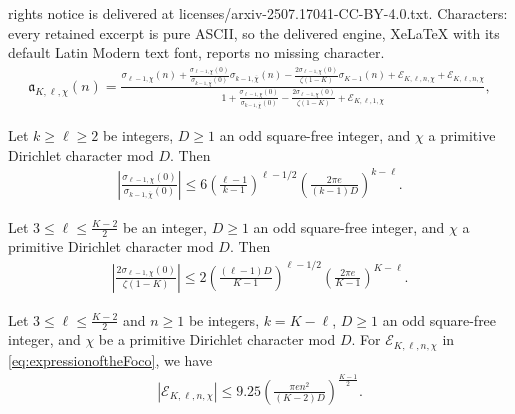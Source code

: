 \documentclass[10pt,a4paper]{amsart}
\begin{document}
rights notice is delivered at licenses/arxiv-2507.17041-CC-BY-4.0.txt. Characters: every retained excerpt is pure ASCII, so the delivered engine, XeLaTeX with its default Latin Modern text font, reports no missing character.
\begin{align}
    \mathfrak{a}_{K,\ell,\chi}(n)=\frac{\sigma_{\ell-1,\chi}(n)+\frac{\sigma_{\ell-1,\chi}(0)}{\sigma_{k-1,\overline{\chi}}(0)}\sigma_{k-1,\overline{\chi}}(n)-\frac{2\sigma_{\ell-1,\chi}(0)}{\zeta(1-K) }\sigma_{K-1}(n)+\mathcal{E}_{K,\ell,n,\chi}+\mathscr{E}_{K,\ell,n,\chi}}{1+\frac{\sigma_{\ell-1,\chi}(0)}{\sigma_{k-1,\overline{\chi}}(0)}-\frac{2\sigma_{\ell-1,\chi}(0)}{\zeta(1-K) }+\mathscr{E}_{K,\ell,1,\chi}}, \label{eq:expressionoftheFoco}
\end{align}

\begin{lemma}\label{lem:bdquotientLvalues}
    Let $k\geq\ell\geq2$ be integers, $D\geq1$ an odd square-free integer, and $\chi$  a primitive Dirichlet character mod $D$. Then
   \begin{align*}
        \left|\frac{\sigma_{\ell-1,\chi}(0)}{\sigma_{k-1,\overline{\chi}}(0)}\right|\leq 6\left(\frac{\ell-1}{k-1}\right)^{\ell-1/2}\left(\frac{2\pi e}{(k-1)D}\right)^{k-\ell}.
         \end{align*}
\end{lemma}

\begin{lemma}\label{lem:bdquotientLandzeta}
    Let $3\leq\ell\leq\frac{K-2}{2}$ be an integer, $D\geq1$ an odd square-free integer, and $\chi$ a primitive Dirichlet character mod $D$. Then
    \begin{align*}
        \left|\frac{2\sigma_{\ell-1,\chi}(0)}{\zeta(1-K) }\right|\leq 2\left(\frac{(\ell-1)D}{K-1}\right)^{\ell-1/2}\left(\frac{2\pi e}{K-1}\right)^{K-\ell}.
    \end{align*}
\end{lemma}

\begin{lemma}\label{lem:bdsmalltermprod}
   Let $3\leq\ell\leq\frac{K-2}{2}$ and $n\ge1$ be integers, $k=K-\ell$, $D\geq1$ an odd square-free integer, and $\chi$ be a primitive Dirichlet character mod $D$. For $\mathcal{E}_{K,\ell,n,\chi}$ in \eqref{eq:expressionoftheFoco}, we have
    \begin{align*}
    |\mathcal{E}_{K,\ell,n,\chi}|\leq9.25\left(\frac{\pi en^2}{(K-2)D}\right)^{\frac{K-1}{2}}.
    \end{align*}
\end{lemma}
\end{document}
